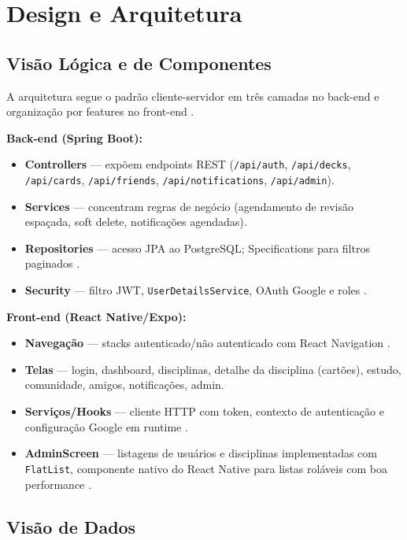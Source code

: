 \chapter{Design e Arquitetura}
\label{cap:arquitetura}

\section{Visão Lógica e de Componentes}

A arquitetura segue o padrão cliente-servidor em três camadas no back-end e organização por features no front-end \cite{tanenbaum2015,pressman2020}.

\textbf{Back-end (Spring Boot):}
\begin{itemize}
    \item \textbf{Controllers} --- expõem endpoints REST (\texttt{/api/auth}, \texttt{/api/decks}, \texttt{/api/cards}, \texttt{/api/friends}, \texttt{/api/notifications}, \texttt{/api/admin}).
    \item \textbf{Services} --- concentram regras de negócio (agendamento de revisão espaçada, soft delete, notificações agendadas).
    \item \textbf{Repositories} --- acesso JPA ao PostgreSQL; Specifications para filtros paginados \cite{jpa_specification}.
    \item \textbf{Security} --- filtro JWT, \texttt{UserDetailsService}, OAuth Google e roles \cite{spring_security_jwt,jwt_io}.
\end{itemize}

\textbf{Front-end (React Native/Expo):}
\begin{itemize}
    \item \textbf{Navegação} --- stacks autenticado/não autenticado com React Navigation \cite{react_navigation}.
    \item \textbf{Telas} --- login, dashboard, disciplinas, detalhe da disciplina (cartões), estudo, comunidade, amigos, notificações, admin.
    \item \textbf{Serviços/Hooks} --- cliente HTTP com token, contexto de autenticação e configuração Google em runtime \cite{mdn_fetch}.
    \item \textbf{AdminScreen} --- listagens de usuários e disciplinas implementadas com \texttt{FlatList}, componente nativo do React Native para listas roláveis com boa performance \cite{react_native_docs}.
\end{itemize}

\section{Visão de Dados}

